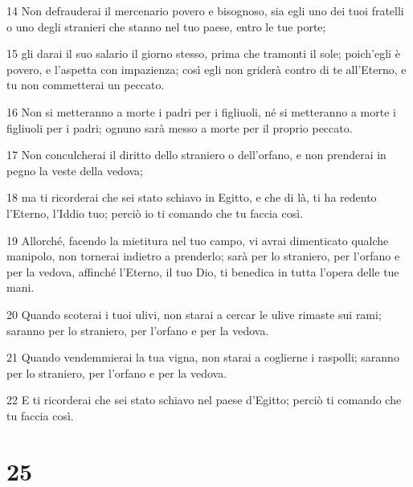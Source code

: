 \par 14 Non defrauderai il mercenario povero e bisognoso, sia egli uno dei tuoi fratelli o uno degli stranieri che stanno nel tuo paese, entro le tue porte;
\par 15 gli darai il suo salario il giorno stesso, prima che tramonti il sole; poich'egli è povero, e l'aspetta con impazienza; così egli non griderà contro di te all'Eterno, e tu non commetterai un peccato.
\par 16 Non si metteranno a morte i padri per i figliuoli, né si metteranno a morte i figliuoli per i padri; ognuno sarà messo a morte per il proprio peccato.
\par 17 Non conculcherai il diritto dello straniero o dell'orfano, e non prenderai in pegno la veste della vedova;
\par 18 ma ti ricorderai che sei stato schiavo in Egitto, e che di là, ti ha redento l'Eterno, l'Iddio tuo; perciò io ti comando che tu faccia così.
\par 19 Allorché, facendo la mietitura nel tuo campo, vi avrai dimenticato qualche manipolo, non tornerai indietro a prenderlo; sarà per lo straniero, per l'orfano e per la vedova, affinché l'Eterno, il tuo Dio, ti benedica in tutta l'opera delle tue mani.
\par 20 Quando scoterai i tuoi ulivi, non starai a cercar le ulive rimaste sui rami; saranno per lo straniero, per l'orfano e per la vedova.
\par 21 Quando vendemmierai la tua vigna, non starai a coglierne i raspolli; saranno per lo straniero, per l'orfano e per la vedova.
\par 22 E ti ricorderai che sei stato schiavo nel paese d'Egitto; perciò ti comando che tu faccia così.

\chapter{25}

